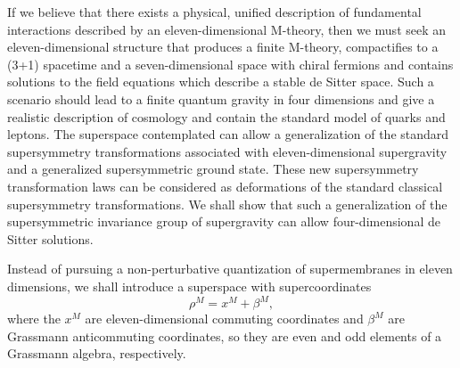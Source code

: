 \documentclass[a4paper,12pt]{article}
\begin{document}
If we believe that there exists a physical, unified description of fundamental
interactions described by an eleven-dimensional M-theory, then we must seek
an eleven-dimensional structure that produces a finite M-theory,
compactifies to a (3+1) spacetime and a seven-dimensional space with chiral
fermions and contains solutions to the field equations which describe a
stable de Sitter space. Such a scenario should lead to a finite quantum
gravity in four dimensions and give a realistic description of cosmology
and contain the standard model of quarks and leptons. The superspace
contemplated can allow a generalization of the standard supersymmetry
transformations associated with eleven-dimensional supergravity and a
generalized supersymmetric ground state. These new supersymmetry
transformation laws can be considered as deformations of the standard
classical supersymmetry transformations. We shall show that such a
generalization of the supersymmetric invariance group of supergravity can
allow four-dimensional de Sitter solutions.

Instead of pursuing a
non-perturbative quantization of supermembranes in eleven dimensions, we
shall introduce a superspace with
supercoordinates~\cite{Moffat2,Moffat3,Moffat4,Moffat5}
\begin{equation}
\label{coordinates}
\rho^M=x^M+\beta^M,
\end{equation}
where the $x^M$ are eleven-dimensional commuting coordinates
and $\beta^M$ are Grassmann anticommuting coordinates, so they
are even and odd elements of a Grassmann algebra, respectively.
\end{document}
